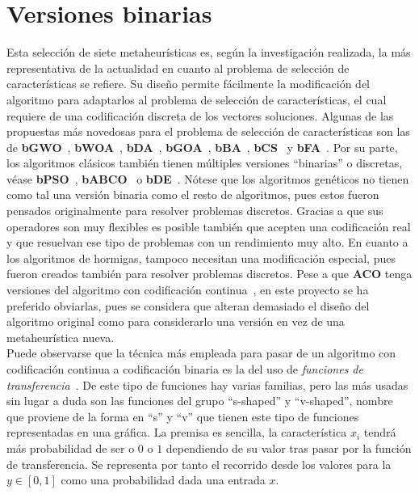 \section{Versiones binarias}
Esta selección de siete metaheurísticas es, según la investigación realizada, la más representativa de la actualidad en cuanto al problema de selección de características se refiere. Su diseño permite fácilmente la modificación del algoritmo para adaptarlos al problema de selección de características, el cual requiere de una codificación discreta de los vectores soluciones. Algunas de las propuestas más novedosas para el problema de selección de características son las de \textbf{bGWO}~\cite{emary_binary_2016}, \textbf{bWOA}~\cite{hussien_s-shaped_2019, mafarja_whale_2018}, \textbf{bDA}~\cite{mafarja_binary_2018}, \textbf{bGOA}~\cite{mafarja_binary_2019}, \textbf{bBA}~\cite{mirjalili_binary_2014}, \textbf{bCS}~\cite{rodrigues_bcs_2013} y \textbf{bFA}~\cite{zhang_return-cost-based_2017}. Por su parte, los algoritmos clásicos también tienen múltiples versiones ``binarias'' o discretas, véase \textbf{bPSO}~\cite{mirjalili_s-shaped_2013}, \textbf{bABCO}~\cite{kiran_binary_2021} o \textbf{bDE}~\cite{pampara_binary_2006}. Nótese que los algoritmos genéticos no tienen como tal una versión binaria como el resto de algoritmos, pues estos fueron pensados originalmente para resolver problemas discretos. Gracias a que sus operadores son muy flexibles es posible también que acepten una codificación real y que resuelvan ese tipo de problemas con un rendimiento muy alto. En cuanto a los algoritmos de hormigas, tampoco necesitan una modificación especial, pues fueron creados también para resolver problemas discretos. Pese a que \textbf{ACO} tenga versiones del algoritmo con codificación continua~\cite{socha_aco_2004}, en este proyecto se ha preferido obviarlas, pues se considera que alteran demasiado el diseño del algoritmo original como para considerarlo una versión en vez de una metaheurística nueva.\\[6pt]
Puede observarse que la técnica más empleada para pasar de un algoritmo con codificación continua a codificación binaria es la del uso de \textit{funciones de transferencia}~\cite{he_novel_2022, mirjalili_s-shaped_2013, dokeroglu_comprehensive_2022}. De este tipo de funciones hay varias familias, pero las más usadas sin lugar a duda son las funciones del grupo ``s-shaped'' y ``v-shaped'', nombre que proviene de la forma en ``s'' y ``v'' que tienen este tipo de funciones representadas en una gráfica. La premisa es sencilla, la característica $x_i$ tendrá más probabilidad de ser o $0$ o $1$ dependiendo de su valor tras pasar por la función de transferencia. Se representa por tanto el recorrido desde los valores para la $y\in[0,1]$ como una probabilidad dada una entrada $x$.

